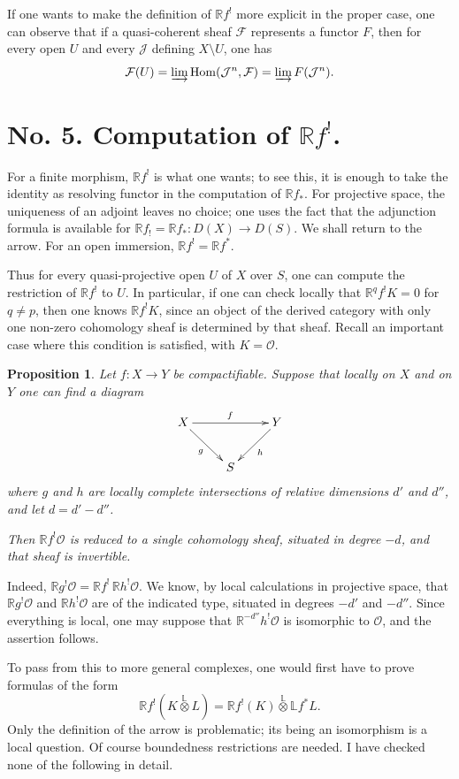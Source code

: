 \documentclass[12pt]{amsart}
\theoremstyle{plain}
\newtheorem{prop}{Proposition}
\theoremstyle{definition}
\DeclareMathOperator{\Hom}{Hom}
\newcommand{\cF}{\mathcal{F}}
\newcommand{\cJ}{\mathcal{J}}
\newcommand{\cO}{\mathcal{O}}
\newcommand{\cD}{D}
\newcommand{\bR}{\mathbb{R}}
\newcommand{\bL}{\mathbb{L}}
\begin{document}
If one wants to make the definition of $\bR f^!$ more explicit in the proper case, one can observe that if a quasi-coherent sheaf $\cF$ represents a functor $F$, then for every open $U$ and every $\cJ$ defining $X\setminus U$, one has
\[
\cF(U)=\varinjlim\Hom(\cJ^n,\cF)=\varinjlim F(\cJ^n).
\]

\section*{No. 5. Computation of $\bR f^!$.}

For a finite morphism, $\bR f^!$ is what one wants; to see this, it is enough to take the identity as resolving functor in the computation of $\bR f_*$. For projective space, the uniqueness of an adjoint leaves no choice; one uses the fact that the adjunction formula is available for $\bR f_!=\bR f_*:\cD(X)\to\cD(S)$. We shall return to the arrow. For an open immersion, $\bR f^!=\bR f^*$.

Thus for every quasi-projective open $U$ of $X$ over $S$, one can compute the restriction of $\bR f^!$ to $U$. In particular, if one can check locally that $\bR^qf^!K=0$ for $q\ne p$, then one knows $\bR f^!K$, since an object of the derived category with only one non-zero cohomology sheaf is determined by that sheaf. Recall an important case where this condition is satisfied, with $K=\cO$.

\begin{prop}
Let $f:X\to Y$ be compactifiable. Suppose that locally on $X$ and on $Y$ one can find a diagram
\[
\xymatrix{
X \ar[rr]^f \ar[dr]_g && Y \ar[dl]^h \\
& S &
}
\]
where $g$ and $h$ are locally complete intersections of relative dimensions $d'$ and $d''$, and let $d=d'-d''$.

Then $\bR f^!\cO$ is reduced to a single cohomology sheaf, situated in degree $-d$, and that sheaf is invertible.
\end{prop}

Indeed, $\bR g^!\cO=\bR f^!\,\bR h^!\cO$. We know, by local calculations in projective space, that $\bR g^!\cO$ and $\bR h^!\cO$ are of the indicated type, situated in degrees $-d'$ and $-d''$. Since everything is local, one may suppose that $\bR^{-d''}h^!\cO$ is isomorphic to $\cO$, and the assertion follows.

To pass from this to more general complexes, one would first have to prove formulas of the form
\[
\bR f^!(K\overset{\mathbb L}{\otimes}L)=\bR f^!(K)\overset{\mathbb L}{\otimes}\bL f^*L.
\]
Only the definition of the arrow is problematic; its being an isomorphism is a local question. Of course boundedness restrictions are needed. I have checked none of the following in detail.
\end{document}
